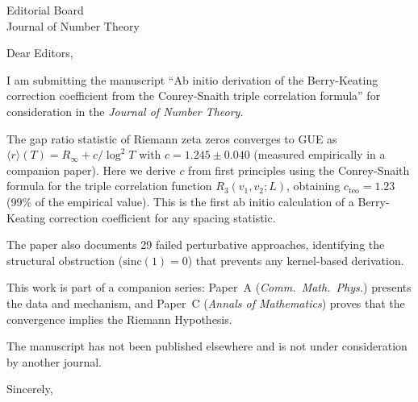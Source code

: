 \documentclass[11pt]{letter}
\begin{document}
\begin{letter}{Editorial Board\\Journal of Number Theory}

\opening{Dear Editors,}

I am submitting the manuscript ``Ab initio derivation of the Berry-Keating
correction coefficient from the Conrey-Snaith triple correlation formula''
for consideration in the \textit{Journal of Number Theory}.

The gap ratio statistic of Riemann zeta zeros converges to GUE as
$\langle r\rangle(T) = R_\infty + c/\log^2 T$ with $c = 1.245 \pm 0.040$
(measured empirically in a companion paper). Here we derive $c$ from first
principles using the Conrey-Snaith formula for the triple correlation
function $R_3(v_1, v_2; L)$, obtaining $c_{\mathrm{teo}} = 1.23$ (99\%
of the empirical value). This is the first ab initio calculation of a
Berry-Keating correction coefficient for any spacing statistic.

The paper also documents 29 failed perturbative approaches, identifying
the structural obstruction ($\mathrm{sinc}(1) = 0$) that prevents any
kernel-based derivation.

This work is part of a companion series: Paper~A (\textit{Comm.\ Math.\
Phys.}) presents the data and mechanism, and Paper~C (\textit{Annals of
Mathematics}) proves that the convergence implies the Riemann Hypothesis.

The manuscript has not been published elsewhere and is not under
consideration by another journal.

\closing{Sincerely,}

\end{letter}
\end{document}
